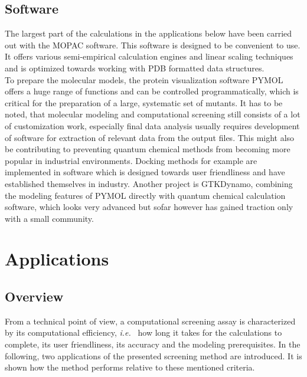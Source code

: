 \subsection{Software}\label{sec:software}
The largest part of the calculations in the applications below have been carried out with the MOPAC software\cite{stewart1990mopac}.
This software is designed to be convenient to use.
It offers various semi-empirical calculation engines and linear scaling techniques and is optimized towards working with PDB formatted data structures.\\
To prepare the molecular models, the protein visualization software PYMOL\cite{PyMOLu} offers a huge range of functions and can be controlled programmatically, which is critical for the preparation of a large, systematic set of mutants.
It has to be noted, that molecular modeling and computational screening still consists of a lot of customization work, especially final data analysis usually requires development of software for extraction of relevant data from the output files.
This might also be contributing to preventing quantum chemical methods from becoming more popular in industrial environments.
Docking methods for example are implemented in software which is designed towards user friendliness and have established themselves in industry\cite{goodsell1996automated}.
Another project is GTKDynamo, combining the modeling features of PYMOL directly with quantum chemical calculation software, which looks very advanced but sofar however has gained traction only with a small community\cite{bachega2013gtkdynamo}.




\section{Applications}\label{sec:apps}

\subsection{Overview}\label{sec:overview}
From a technical point of view, a computational screening assay is characterized by its computational efficiency, \textit{i.e. } how long it takes for the calculations to complete, its user friendliness, its accuracy and the modeling prerequisites.
In the following, two applications of the presented screening method are introduced.
It is shown how the method performs relative to these mentioned criteria.

